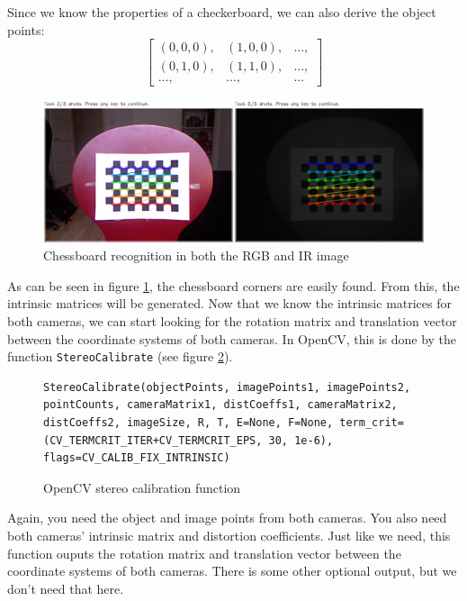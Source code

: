 Since we know the properties of a checkerboard, we can also derive the object points:
\[
\left[ \begin{array}{ccc}
\left(0, 0, 0\right), & \left(1, 0, 0\right), & ...,\\
\left(0, 1, 0\right), & \left(1, 1, 0\right), & ...,\\
..., & ..., & ...
\end{array}\right]
\]

\begin{figure}[H]
\centering
\includegraphics[scale=0.6]{images/chessboard.png}
\caption{Chessboard recognition in both the RGB and IR image}
\label{fig:chessboard}
\end{figure}

As can be seen in figure \ref{fig:chessboard}, the chessboard corners are easily found. From this, the intrinsic matrices will be generated. Now that we know the intrinsic matrices for both cameras, we can start looking for the rotation matrix and translation vector between the coordinate systems of both cameras. In OpenCV, this is done by the function \verb|StereoCalibrate| (see figure \ref{code:stereocalibrate}). 

\begin{figure}[H]
\begin{lstlisting}
StereoCalibrate(objectPoints, imagePoints1, imagePoints2, pointCounts, cameraMatrix1, distCoeffs1, cameraMatrix2, distCoeffs2, imageSize, R, T, E=None, F=None, term_crit=(CV_TERMCRIT_ITER+CV_TERMCRIT_EPS, 30, 1e-6), flags=CV_CALIB_FIX_INTRINSIC)
\end{lstlisting}
\caption{OpenCV stereo calibration function}
\label{code:stereocalibrate}
\end{figure}

Again, you need the object and image points from both cameras. You also need both cameras' intrinsic matrix and distortion coefficients. Just like we need, this function ouputs the rotation matrix and translation vector between the coordinate systems of both cameras. There is some other optional output, but we don't need that here.

